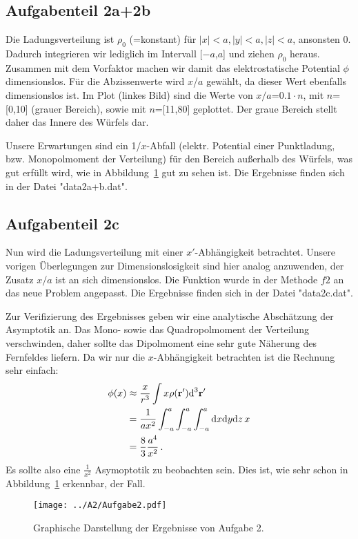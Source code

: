 \subsection*{Aufgabenteil 2a+2b} Die Ladungsverteilung ist $\rho_0$ (=konstant) für $\left|x\right|<
a,\left|y\right| < a,\left|z\right| < a$, ansonsten 0. Dadurch integrieren wir lediglich im
Intervall [$-a$,$a$] und ziehen $\rho_0$ heraus. Zusammen mit dem Vorfaktor machen wir damit das
elektrostatische Potential $\phi$ dimensionslos. Für die Abzissenwerte wird $x$/$a$ gewählt, da
dieser Wert ebenfalls dimensionslos ist. Im Plot (linkes Bild) sind die Werte von $x/a$=$0.1\cdot
n$, mit $n$=[0,10] (grauer Bereich), sowie mit $n$=[11,80] geplottet. Der graue Bereich stellt daher
das Innere des Würfels dar.

Unsere Erwartungen sind ein 1/$x$-Abfall (elektr. Potential einer Punktladung, bzw. Monopolmoment
der Verteilung) für den Bereich außerhalb des Würfels, was gut erfüllt wird, wie in
Abbildung~\ref{fig:a2} gut zu sehen ist. Die Ergebnisse finden sich in der Datei "data2a+b.dat".

\subsection*{Aufgabenteil 2c} Nun wird die Ladungsverteilung mit einer $x'$-Abhängigkeit betrachtet.
Unsere vorigen Überlegungen zur Dimensionslosigkeit sind hier analog anzuwenden, der Zusatz $x/a$
ist an sich dimensionslos. Die Funktion wurde in der Methode $f2$ an das neue Problem angepasst.
Die Ergebnisse finden sich in der Datei "data2c.dat".

Zur Verifizierung des Ergebnisses geben wir eine analytische Abschätzung der Asymptotik an. Das
Mono- sowie das Quadropolmoment der Verteilung verschwinden, daher sollte das Dipolmoment eine sehr
gute Näherung des Fernfeldes liefern. Da wir nur die $x$-Abhängigkeit betrachten ist die Rechnung
sehr einfach:
\begin{equation}
	\begin{split}
		\phi (x) &\approx \frac{x}{r^3}\int x \rho(\textbf{r}')\textup{d}^3\textbf{r}' \\
		&=\frac{1}{ax^2} \int_{-a}^{a} \int_{-a}^{a} \int_{-a}^{a}
		\textup{d}x\textup{d}y\textup{d}z\, x \\
		&= \frac{8}{3}\frac{a^4}{x^2}\,. \\
 	\end{split}
	\label{eqn:dipol}
\end{equation}
Es sollte also eine $\frac{1}{x^2}$ Asymoptotik zu beobachten sein. Dies ist, wie sehr schon in
Abbildung~\ref{fig:a2} erkennbar, der Fall.
\begin{landscape}
	\begin{figure}
		\texttt{[image: ../A2/Aufgabe2.pdf]}
		\caption{Graphische Darstellung der Ergebnisse von Aufgabe 2.}
		\label{fig:a2}
	\end{figure}
\end{landscape}
\printbibliography

